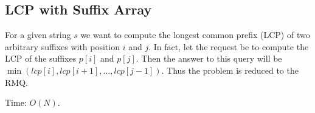 \subsection{LCP with Suffix Array}

For a given string $s$ we want to compute the longest common prefix (LCP) of two arbitrary suffixes with position $i$ and $j$. In fact, let the request be to compute the LCP of the suffixes $p[i]$ and $p[j]$. Then the answer to this query will be $\min(lcp[i], lcp[i+1], \dots, lcp[j-1])$. Thus the problem is reduced to the RMQ.

Time: $O(N)$.
